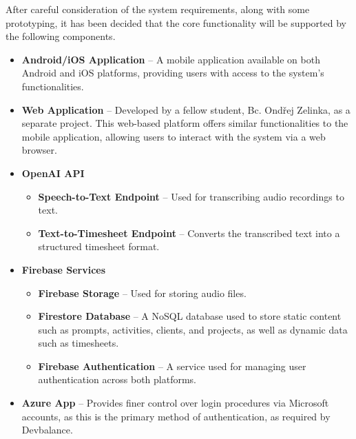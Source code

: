 \documentclass[
  digital,     %
  oneside,     %
  nosansbold,  %
  nocolorbold, %
  lof,         %
  lot,         %
]{fithesis4}
\begin{document}
After careful consideration of the system requirements, along with some prototyping, it has been decided that the core functionality will be supported by the following components.

\begin{itemize}
    \item \textbf{Android/iOS Application} – A mobile application available on both Android and iOS platforms, providing users with access to the system's functionalities.
    \item \textbf{Web Application} – Developed by a fellow student, Bc. Ondřej Zelinka, as a separate project. This web-based platform offers similar functionalities to the mobile application, allowing users to interact with the system via a web browser.
    \item \textbf{OpenAI API}
    \begin{itemize}
        \item \textbf{Speech-to-Text Endpoint} – Used for transcribing audio recordings to text.
        \item \textbf{Text-to-Timesheet Endpoint} – Converts the transcribed text into a structured timesheet format.
    \end{itemize}
    \item \textbf{Firebase Services}
    \begin{itemize}
        \item \textbf{Firebase Storage} – Used for storing audio files.
        \item \textbf{Firestore Database} – A NoSQL database used to store static content such as prompts, activities, clients, and projects, as well as dynamic data such as timesheets.
        \item \textbf{Firebase Authentication} – A service used for managing user authentication across both platforms.
    \end{itemize}
    \item \textbf{Azure App} – Provides finer control over login procedures via Microsoft accounts, as this is the primary method of authentication, as required by Devbalance.
\end{itemize}
\end{document}
